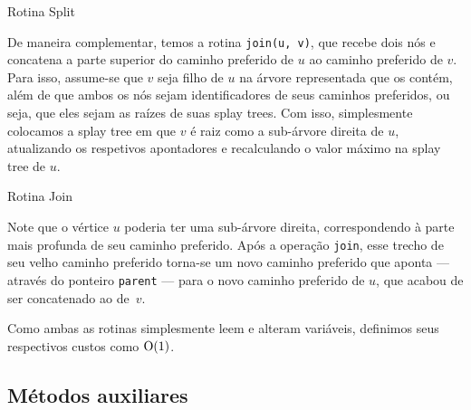 \begin{algorithm}[H]
    \caption{Rotina Split}\label{splay:split}
    \begin{algorithmic}[1]
        \EndIf
        \EndFunction
    \end{algorithmic}
\end{algorithm}

De maneira complementar, temos a rotina \texttt{join(u, v)}, que recebe dois nós e concatena a parte superior do caminho preferido de $u$ ao caminho preferido de $v$. Para isso, assume-se que $v$ seja filho de $u$ na árvore representada que os contém, além de que ambos os nós sejam identificadores de seus caminhos preferidos, ou seja, que eles sejam as raízes de suas splay trees. Com isso, simplesmente colocamos a splay tree em que $v$ é raiz como a sub-árvore direita de $u$, atualizando os respetivos apontadores e recalculando o valor máximo na splay tree de $u$.

\begin{algorithm}[h!]
    \caption{Rotina Join}\label{splay:join}
    \begin{algorithmic}[1]
        \EndIf
        \State {}
        \EndFunction
    \end{algorithmic}
\end{algorithm}

Note que o vértice $u$ poderia ter uma sub-árvore direita, correspondendo à parte mais profunda de seu caminho preferido. Após a operação \texttt{join}, esse trecho de seu velho caminho preferido torna-se um novo caminho preferido que aponta --- através do ponteiro \texttt{parent} --- para o novo caminho preferido de $u$, que acabou de ser concatenado ao de~$v$.

Como ambas as rotinas simplesmente leem e alteram variáveis, definimos seus respectivos custos como $\mathrm{O}(1)$.

\subsection{Métodos auxiliares}
\label{subsection:lct-splay-aux}

